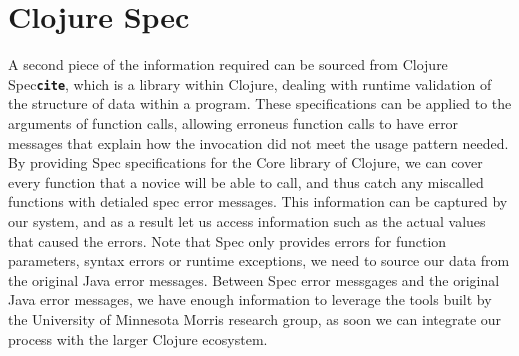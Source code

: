 \documentclass[12pt]{article}
\newcommand{\comment}[1]{{\bf \tt  {#1}}}
\newcommand{\emcomment}[1]{\textcolor{ForestGreen}{\comment{Elena: {#1}}}}
\begin{document}

\section{Clojure Spec}
A second piece of the information required can be sourced from Clojure Spec\comment{cite},
which is a library within Clojure, dealing with runtime validation of
the structure of data within a program. These specifications can be applied to
 the arguments of function calls, allowing erroneus function calls to have
 error messages that explain how the invocation did not meet the usage pattern
 needed. By providing Spec specifications for the Core library of Clojure,
 we can cover every function that a novice will be able to call, and thus catch
 any miscalled functions with detialed spec error messages.
 This information can be captured by our system, and as a result
 let us access information such as the actual values that caused the errors.
Note that Spec only provides errors for function parameters, syntax errors or
runtime exceptions, we need to source our data from the original Java error messages.
Between Spec error messgages and the original Java error messages, we have enough
information to leverage the tools built by the
 University of Minnesota Morris research group, as soon we can integrate
 our process with the larger Clojure ecosystem.
\end{document}
